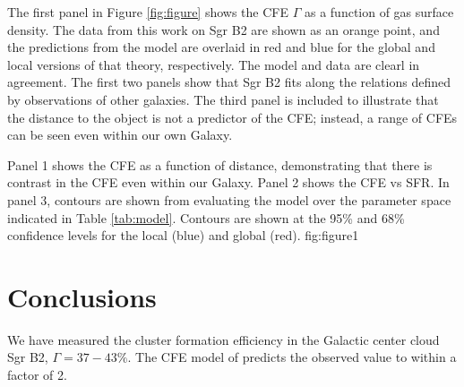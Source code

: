 \documentclass[twocolumn]{aastex62}
\begin{document}
The first panel in Figure \ref{fig:figure} shows the CFE $\Gamma$ as a function
of gas surface density.  The data from this work on Sgr B2 are shown as an
orange point, and the predictions from the \citet{Kruijssen2012a} model are
overlaid in red and blue for the global and local versions of that theory,
respectively.  The model and data are clearl in agreement.  The first two
panels show that Sgr B2 fits along the relations defined by observations of
other galaxies.  The third panel is included to illustrate that the distance
to the object is not a predictor of the CFE; instead, a range of CFEs can be
seen even within our own Galaxy.

{Panel 1 shows the CFE as a function of distance, demonstrating that there is
contrast in the CFE even within our Galaxy.
Panel 2 shows the CFE vs SFR.
In panel 3, contours are shown from evaluating the \citet{Kruijssen2012a} model
over the parameter space indicated in Table \ref{tab:model}.  Contours are shown
at the 95\% and 68\% confidence levels for the local (blue) and global (red).
}
{fig:figure}{1}{\textwidth}

\section{Conclusions}
We have measured the cluster formation efficiency in the Galactic center cloud
Sgr B2, $\Gamma=37-43\%$.  The CFE model of \citet{Kruijssen2012a} predicts the
observed value to within a factor of 2.





\end{document}
